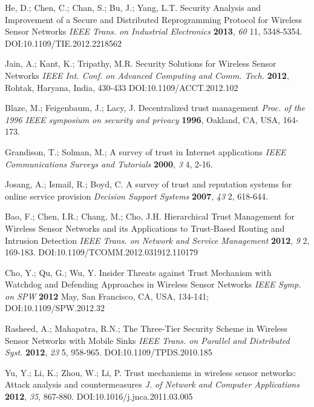 \documentclass{ws-fnl2}
\begin{document}
\begin{thebibliography}{99}
He, D.; Chen, C.; Chan, S.; Bu, J.; Yang, L.T. Security Analysis and Improvement of a Secure and Distributed Reprogramming Protocol for Wireless Sensor Networks {\em IEEE Trans. on Industrial Electronics} {\bf 2013}, {\em 60} 11, 5348-5354. DOI:10.1109/TIE.2012.2218562 

Jain, A.; Kant, K.; Tripathy, M.R. Security Solutions for Wireless Sensor Networks {\em IEEE Int. Conf. on Advanced Computing and Comm. Tech.} {\bf 2012}, Rohtak, Haryana, India, 430-433 DOI:10.1109/ACCT.2012.102 



Blaze, M.; Feigenbaum, J.; Lacy, J. Decentralized trust management {\em Proc. of the 1996 IEEE symposium on security and privacy} {\bf 1996}, Oakland, CA, USA, 164-173.

Grandison, T.; Solman, M.; A survey of trust in Internet applications {\em IEEE Communications Surveys and Tutorials} {\bf 2000}, {\em 3} 4, 2-16.

Josang, A.; Ismail, R.; Boyd, C. A survey of trust and reputation systems for online service provision {\em Decision Support Systems} {\bf 2007}, {\em 43} 2, 618-644. 

Bao, F.; Chen, I.R.; Chang, M.; Cho, J.H. Hierarchical Trust Management for Wireless Sensor Networks and its Applications to Trust-Based Routing and Intrusion Detection {\em IEEE Trans. on Network and Service Management} {\bf 2012}, {\em 9} 2, 169-183. DOI:10.1109/TCOMM.2012.031912.110179 

Cho, Y.; Qu, G.; Wu, Y. Insider Threats against Trust Mechanism with Watchdog and Defending Approaches in Wireless Sensor Networks {\em IEEE Symp. on SPW} {\bf 2012} May, San Francisco, CA, USA, 134-141; DOI:10.1109/SPW.2012.32 

Rasheed, A.; Mahapatra, R.N.; The Three-Tier Security Scheme in Wireless Sensor Networks with Mobile Sinks {\em IEEE Trans. on Parallel and Distributed Syst.} {\bf 2012}, {\em 23} 5, 958-965. DOI:10.1109/TPDS.2010.185 

Yu, Y.; Li, K.; Zhou, W.; Li, P. Trust mechanisms in wireless sensor networks: Attack analysis and countermeasures {\em J. of Network and Computer Applications} {\bf 2012}, {\em 35}, 867-880. DOI:10.1016/j.jnca.2011.03.005








\end{thebibliography}
\end{document}
